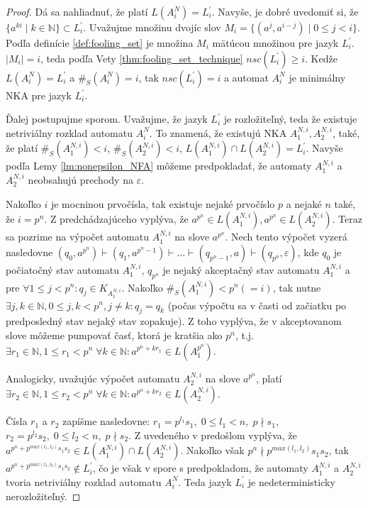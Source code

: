 \begin{proof}
Dá sa nahliadnuť, že platí $ L(A_i^N) = L^{\prime}_i $. Navyše, je dobré uvedomiť si, že $ \lbrace a^{ki} \; | \; k \in \mathbb{N} \rbrace \subset L^{\prime}_i $. Uvažujme množinu dvojíc slov $ M_i = \lbrace (a^j,a^{i-j}) \; | \; 0 \leq j < i  \rbrace $. Podľa definície \ref{def:fooling_set} je množina $ M_i $ mätúcou množinou pre jazyk $ L^{\prime}_i $. $ |M_i|=i $, teda podľa Vety \ref{thm:fooling_set_technique} $ nsc(L^{\prime}_i) \geq i $. Kedže $ L(A_i^N) = L^{\prime}_i $ a $ \#_S(A_i^N) = i $, tak $nsc(L^{\prime}_i) = i $ a automat $ A_i^N $ je minimálny NKA pre jazyk $ L^{\prime}_i $.
\par
Ďalej postupujme sporom. Uvažujme, že jazyk $ L^{\prime}_{i} $ je rozložiteľný, teda že existuje netriviálny rozklad automatu $ A_i^N $. To znamená, že existujú NKA $ A_1^{N,i}, A_2^{N,i} $, také, že platí $ \#_S(A_1^{N,i}) < i $, $ \#_S(A_2^{N,i}) < i $, $ L(A_1^{N,i}) \cap L(A_2^{N,i}) = L^{\prime}_i $. Navyše podľa Lemy \ref{lm:nonepsilon_NFA} môžeme predpokladať, že automaty $ A_1^{N,i}$ a $ A_2^{N,i} $ neobsahujú prechody na $ \varepsilon $. 
\par
Nakoľko $ i $ je mocninou prvočísla, tak existuje nejaké prvočíslo $ p $ a nejaké $ n $ také, že $ i=p^n $. Z predchádzajúceho vyplýva, že $ a^{p^n} \in L(A_1^{N,i}), a^{p^n} \in L(A_2^{N,i})$. Teraz sa pozrime na výpočet automatu $ A_1^{N,i} $ na slove $ a^{p^n} $. Nech tento výpočet vyzerá nasledovne $ (q_0,a^{p^n}) \vdash (q_1,a^{p^n-1}) \vdash \dots \vdash (q_{p^n-1},a) \vdash (q_{p^n},\varepsilon) $, kde $ q_0 $ je počiatočný stav automatu $ A_1^{N,i} $, $ q_{p^n} $ je nejaký akceptačný stav automatu $ A_1^{N,i} $ a pre $ \forall 1 \leq j < p^n : q_j \in K_{A_1^{N,i}}$. Nakoľko $ \#_S(A_1^{N,i}) < p^n(=i) $, tak nutne $ \exists j,k \in \mathbb{N}, 0 \leq j,k < p^n, j \neq k: q_j = q_k $ (počas výpočtu sa v časti \glqq{}od začiatku po predposledný stav\grqq{} nejaký stav zopakuje). Z toho vyplýva, že v akceptovanom slove môžeme pumpovať časť, ktorá je kratšia ako $ p^n $, t.j. $ \exists r_1 \in \mathbb{N}, 1 \leq r_1 < p^n \; \forall k \in \mathbb{N}: a^{p^n+kr_1} \in L(A_1^{p^n})$. 
\par
Analogicky, uvažujúc výpočet automatu $ A_2^{N,i} $ na slove $ a^{p^n} $, platí $ \exists r_2 \in \mathbb{N}, 1 \leq r_2 < p^n \; \forall k \in \mathbb{N}: a^{p^n+kr_2} \in L(A_2^{N,i})$.
\par
Čísla $ r_1 $ a $ r_2 $ zapíšme nasledovne: $ r_1 = p^{l_1}s_1, \; 0 \leq l_1 < n, \; p \nmid s_1 $, $ r_2 = p^{l_2}s_2, \; 0 \leq l_2 < n, \; p \nmid s_2 $. Z uvedeného v predošlom vyplýva, že $ a^{p^n + p^{max(l_1,l_2)}s_1s_2} \in L(A_1^{N,i}) \cap L(A_2^{N,i}) $. Nakoľko však $ p^n \nmid p^{max(l_1,l_2)}s_1s_2$, tak $ a^{p^n + p^{max(l_1,l_2)}s_1s_2} \notin L^{\prime}_{i} $, čo je však v spore s predpokladom, že automaty $ A_1^{N,i} $ a $ A_2^{N,i} $ tvoria netriviálny rozklad automatu $ A_{i}^N $. Teda jazyk $ L^{\prime}_i $ je nedeterministicky nerozložiteľný.

\end{proof}
